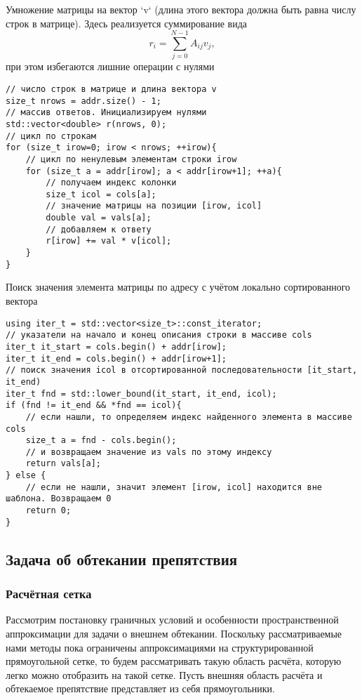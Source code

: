 Умножение матрицы на вектор `v` (длина этого вектора должна быть равна числу строк в матрице).
Здесь реализуется суммирование вида
\begin{equation*}
    r_i = \sum_{j=0}^{N-1} A_{ij} v_j,
\end{equation*}
при этом избегаются лишние операции с нулями
\begin{verbatim}
// число строк в матрице и длина вектора v
size_t nrows = addr.size() - 1;
// массив ответов. Инициализируем нулями
std::vector<double> r(nrows, 0);
// цикл по строкам
for (size_t irow=0; irow < nrows; ++irow){
	// цикл по ненулевым элементам строки irow
	for (size_t a = addr[irow]; a < addr[irow+1]; ++a){
		// получаем индекс колонки
		size_t icol = cols[a];
		// значение матрицы на позиции [irow, icol]
		double val = vals[a];
		// добавляем к ответу
		r[irow] += val * v[icol];
	}
}
\end{verbatim}


Поиск значения элемента матрицы по адресу  с учётом локально сортированного вектора 
\begin{verbatim}
using iter_t = std::vector<size_t>::const_iterator;
// указатели на начало и конец описания строки в массиве cols
iter_t it_start = cols.begin() + addr[irow];
iter_t it_end = cols.begin() + addr[irow+1];
// поиск значения icol в отсортированной последовательности [it_start, it_end)
iter_t fnd = std::lower_bound(it_start, it_end, icol);
if (fnd != it_end && *fnd == icol){
	// если нашли, то определяем индекс найденного элемента в массиве cols
	size_t a = fnd - cols.begin();
	// и возвращаем значение из vals по этому индексу
	return vals[a];
} else {
	// если не нашли, значит элемент [irow, icol] находится вне шаблона. Возвращаем 0
	return 0;
}
\end{verbatim}

\subsection{Задача об обтекании препятствия}
\label{sec:problem-obstacle}

\subsubsection{Расчётная сетка}
Рассмотрим постановку граничных условий и особенности пространственной аппроксимации для задачи
о внешнем обтекании. Поскольку рассматриваемые нами методы
пока ограничены аппроксимациями на структурированной прямоугольной
сетке, то будем рассматривать такую область расчёта,
которую легко можно отобразить на такой сетке. Пусть внешняя
область расчёта и обтекаемое препятствие представляет из себя прямоугольники.

